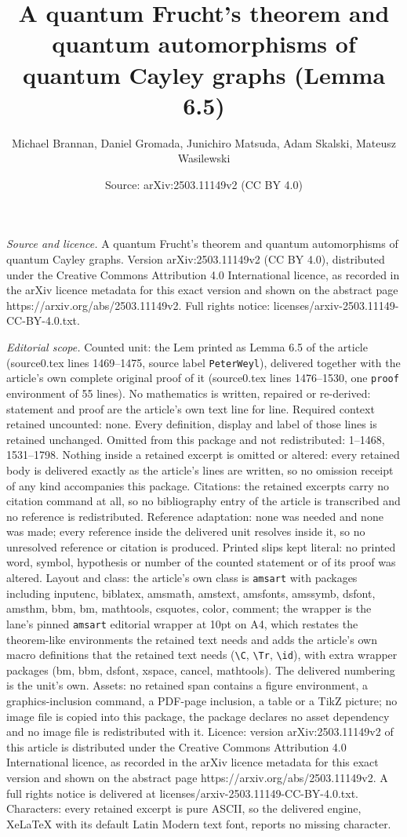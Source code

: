 \documentclass[10pt,a4paper]{amsart}
\title[A quantum Frucht's theorem and quantum automorphisms of quan]{A quantum Frucht's theorem and quantum automorphisms of quantum Cayley graphs (Lemma 6.5)}
\author{Michael Brannan, Daniel Gromada, Junichiro Matsuda, Adam Skalski, Mateusz Wasilewski}
\date{Source: arXiv:2503.11149v2 (CC BY 4.0)}
\begin{document}
\maketitle

\noindent\emph{Source and licence.} A quantum Frucht's theorem and quantum automorphisms of quantum Cayley graphs. Version arXiv:2503.11149v2 (CC BY 4.0), distributed under the Creative Commons Attribution 4.0 International licence, as recorded in the arXiv licence metadata for this exact version and shown on the abstract page https://arxiv.org/abs/2503.11149v2. Full rights notice: licenses/arxiv-2503.11149-CC-BY-4.0.txt.\par\smallskip

\noindent\textit{Editorial scope.} Counted unit: the Lem printed as Lemma 6.5 of the article (source0.tex lines 1469--1475, source label \texttt{PeterWeyl}), delivered together with the article's own complete original proof of it (source0.tex lines 1476--1530, one \texttt{proof} environment of 55 lines). No mathematics is written, repaired or re-derived: statement and proof are the article's own text line for line. Required context retained uncounted: none. Every definition, display and label of those lines is retained unchanged. Omitted from this package and not redistributed: 1--1468, 1531--1798. Nothing inside a retained excerpt is omitted or altered: every retained body is delivered exactly as the article's lines are written, so no omission receipt of any kind accompanies this package. Citations: the retained excerpts carry no citation command at all, so no bibliography entry of the article is transcribed and no reference is redistributed. Reference adaptation: none was needed and none was made; every reference inside the delivered unit resolves inside it, so no unresolved reference or citation is produced. Printed slips kept literal: no printed word, symbol, hypothesis or number of the counted statement or of its proof was altered. Layout and class: the article's own class is \texttt{amsart} with packages including inputenc, biblatex, amsmath, amstext, amsfonts, amssymb, dsfont, amsthm, bbm, bm, mathtools, csquotes, color, comment; the wrapper is the lane's pinned \texttt{amsart} editorial wrapper at 10pt on A4, which restates the theorem-like environments the retained text needs and adds the article's own macro definitions that the retained text needs (\texttt{\textbackslash C}, \texttt{\textbackslash Tr}, \texttt{\textbackslash id}), with extra wrapper packages (bm, bbm, dsfont, xspace, cancel, mathtools). The delivered numbering is the unit's own. Assets: no retained span contains a figure environment, a graphics-inclusion command, a PDF-page inclusion, a table or a TikZ picture; no image file is copied into this package, the package declares no asset dependency and no image file is redistributed with it. Licence: version arXiv:2503.11149v2 of this article is distributed under the Creative Commons Attribution 4.0 International licence, as recorded in the arXiv licence metadata for this exact version and shown on the abstract page https://arxiv.org/abs/2503.11149v2. A full rights notice is delivered at licenses/arxiv-2503.11149-CC-BY-4.0.txt. Characters: every retained excerpt is pure ASCII, so the delivered engine, XeLaTeX with its default Latin Modern text font, reports no missing character.
\end{document}
